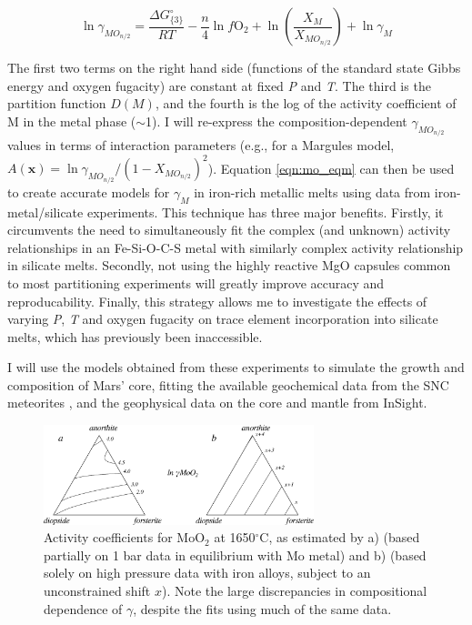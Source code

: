 \documentclass[11pt,twoside,a4paper]{article}
\begin{document}
\begin{equation}
  \ln \gamma_{MO_{n/2}}  = \frac{\Delta G^{\circ}_{\{3\}}}{RT} - \frac{n}{4} \ln f\textrm{O}_2 + \ln \left( \frac{X_M}{X_{MO_{n/2}}} \right) + \ln \gamma_M
  \label{eqn:mo_eqm}
\end{equation}

The first two terms on the right hand side (functions of the standard state Gibbs energy and oxygen fugacity) are constant at fixed \emph{P} and \emph{T}. The third is the partition function $D(M)$, and the fourth is the log of the activity coefficient of M in the metal phase ($\sim$1). I will re-express the composition-dependent $\gamma_{MO_{n/2}}$ values in terms of interaction parameters (e.g., for a Margules model, $A(\mathbf{x}) = \ln \gamma_{MO_{n/2}} / (1-X_{MO_{n/2}})^2$). Equation \ref{eqn:mo_eqm} can then be used to create accurate models for $\gamma_M$ in iron-rich metallic melts using data from iron-metal/silicate experiments. This technique has three major benefits. Firstly, it circumvents the need to simultaneously fit the complex (and unknown) activity relationships in an Fe-Si-O-C-S metal with similarly complex activity relationship in silicate melts. Secondly, not using the highly reactive MgO capsules common to most partitioning experiments will greatly improve accuracy and reproducability. Finally, this strategy allows me to investigate the effects of varying \emph{P}, \emph{T} and oxygen fugacity on trace element incorporation into silicate melts, which has previously been inaccessible. %

I will use the models obtained from these experiments to simulate the growth and composition of Mars' core, fitting the available geochemical data from the SNC meteorites \citep[as previously done for Earth;][]{WW2005}, and the geophysical data on the core and mantle from InSight.

\begin{figure}[!ht]
  \centering
  \includegraphics[width=0.7\textwidth]{figures/Mo_partitioning}
  \caption{Activity coefficients for MoO$_2$ at 1650$^{\circ}$C, as estimated by a) \cite{WW2013} (based partially on 1 bar data in equilibrium with Mo metal) and b) \cite{RC2011} (based solely on high pressure data with iron alloys, subject to an unconstrained shift $x$). Note the large discrepancies in compositional dependence of $\gamma$, despite the fits using much of the same data.}
  \label{fig:expt_gammas}
\end{figure} 
\end{document}
